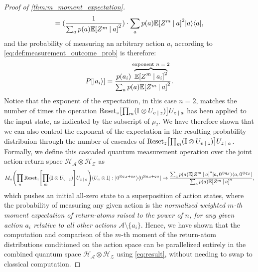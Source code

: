 \documentclass{article}
\DeclarePairedDelimiter{\bra}{\langle}{\rvert} %
\DeclarePairedDelimiter{\ket}{\lvert}{\rangle} %
\DeclarePairedDelimiter{\paren}{\lparen}{\rparen} %
\DeclarePairedDelimiter{\bparen}{[}{]} %
\newcommand{\E}{\mathbb{E}} %
\newcommand{\hilbert}{\mathcal{H}} %
\newcommand{\bfunc}[2]{#1\bparen*{#2}} %
\newcommand{\given}[1][]{\:#1\vert\:}
\begin{document}
\begin{proof}[Proof of \cref{thm:m_moment_expectation}]
\begin{equation}
= (\frac{1}{\sum_{a} p(a) \bfunc{\mathbb{E}}{Z^{m} \given a}^2}) \cdot \sum_{a} p(a) \bfunc{\mathbb{E}}{Z^{m} \given a}^2 \ket{a}\bra{a},
\end{equation}
% 
and the probability of measuring an arbitrary action $a_i$ according to \cref{eq:def:measurement_outcome_prob} is therefore:
% 
\begin{equation}
\bfunc{P}{\ket{a_i}} = \frac{p(a_i) \overbrace{\bfunc{\mathbb{E}}{Z^{m} \given a_i}^{2}}^{\textrm{exponent $n=2$}}}{\sum_{a} p(a) \bfunc{\mathbb{E}}{Z^{m} \given a}^2}.
\end{equation}
% 
Notice that the exponent of the expectation, in this case $n=2$, matches the number of times the operation $\textrm{Reset}_{z} \bparen*{\prod_{m} (\mathbb{I} \otimes U_{v \given z})} U_{z \given a}$ has been applied to the input state, as indicated by the subscript of $\rho_2$. 
% 
We have therefore shown that we can also control the exponent of the expectation in the resulting probability distribuion through the number of cascades of $\textrm{Reset}_{z} \bparen*{\prod_{m} (\mathbb{I} \otimes U_{v \given z})} U_{z \given a}$.
% 
Formally, we define this cascaded quantum measurement operation over the joint action-return space $\hilbert_{\mathcal{A}} \otimes \hilbert_{\mathcal{Z}}$ as
% 
\begin{equation}\label{eq:result}
M_{a} \paren*{\prod_{n} \textrm{Reset}_{z} \bparen*{\prod_{m} (\mathbb{I} \otimes U_{v \given z})} U_{z \given a}} (U_{a} \otimes \mathbb{I})
: \ket{0^{\otimes q_{\mathcal{A}} + q_{\mathcal{Z}}}}\bra{0^{\otimes q_{\mathcal{A}} + q_{\mathcal{Z}}}} 
\to \frac{\sum_{a} p(a) \bfunc{\mathbb{E}}{Z^{m} \given a}^{n} \ket{a,0^{\otimes q_{\mathcal{Z}}}}\bra{a,0^{\otimes q_{\mathcal{Z}}}}}{\sum_{a} p(a) \bfunc{\mathbb{E}}{Z^{m} \given a}^{n}},
\end{equation}
% 
which pushes an initial all-zero state to a superposition of action states, where the probability of measuring any given action is the \emph{normalized weighted $m$-th moment expectation of return-atoms raised to the power of $n$, for any given action $a_i$ relative to all other actions $\mathcal{A} \setminus \{a_i\}$}.
% 
Hence, we have shown that the computation and comparison of the $m$-th moment of the return-atom distributions conditioned on the action space can be parallelized entirely in the combined quantum space $\hilbert_{\mathcal{A}} \otimes \hilbert_{\mathcal{Z}}$ using \cref{eq:result}, without needing to swap to classical computation.
\end{proof}
\end{document}

